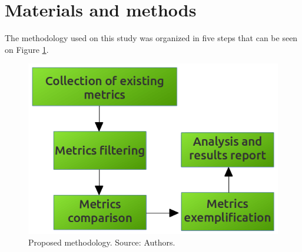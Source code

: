 \documentclass[conference]{IEEEtran}
\begin{document}
\section{Materials and methods}

The methodology used on this study was organized in five steps that can be seen on Figure \ref{metodologia}.

\begin{figure}[ht]
  \centering
  \includegraphics[width=.3\textwidth]{figuras/metodologia.png}
  \caption{Proposed methodology. Source: Authors.}
  \label{metodologia}
\end{figure}
\end{document}
